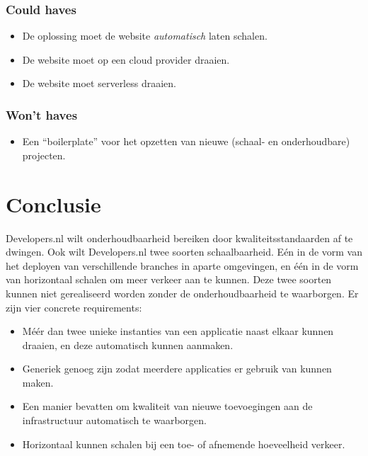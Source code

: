 \subsubsection{Could haves}
\begin{itemize}
	\item De oplossing moet de website \textit{automatisch} laten schalen.
	\item De website moet op een cloud provider draaien.
	\item De website moet serverless draaien.
\end{itemize}

\subsubsection{Won't haves}
\begin{itemize}
	\item Een \enquote{boilerplate} voor het opzetten van nieuwe (schaal- en onderhoudbare) projecten.
\end{itemize}

\section{Conclusie}
Developers.nl wilt onderhoudbaarheid bereiken door kwaliteitsstandaarden af te dwingen. Ook wilt Developers.nl twee soorten schaalbaarheid. Eén in de vorm van het deployen van verschillende branches in aparte omgevingen, en één in de vorm van horizontaal schalen om meer verkeer aan te kunnen. Deze twee soorten kunnen niet gerealiseerd worden zonder de onderhoudbaarheid te waarborgen. Er zijn vier concrete requirements:

\begin{itemize}
	\item Méér dan twee unieke instanties van een applicatie naast elkaar kunnen draaien, en deze automatisch kunnen aanmaken.
	\item Generiek genoeg zijn zodat meerdere applicaties er gebruik van kunnen maken.
	\item Een manier bevatten om kwaliteit van nieuwe toevoegingen aan de infrastructuur automatisch te waarborgen.
	\item Horizontaal kunnen schalen bij een toe- of afnemende hoeveelheid verkeer.
\end{itemize}
